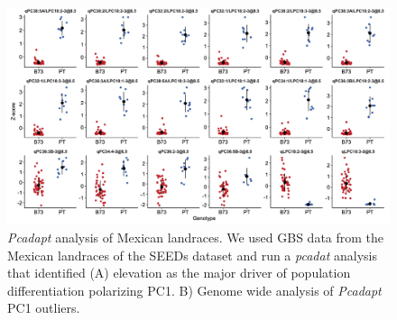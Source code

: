 \documentclass[9pt,twocolumn,twoside,lineno]{BioRxiv}
\begin{document}
\begin{figure}[t]
\begin{center}
\includegraphics[width=0.8\paperwidth]{Sup_Figures/Sup_Fig_2.png}
\caption{\textit{Pcadapt} analysis of Mexican landraces. We used GBS data from the Mexican landraces of the SEEDs dataset \cite{Romero_Navarro2017-cn} and run a \textit{pcadat} analysis \cite{Luu2017-ws} that identified (A) elevation as the major driver of population differentiation polarizing PC1.  
B) Genome wide analysis of \textit{Pcadapt} PC1 outliers. 
}
\label{SupFig2}
\end{center}
\end{figure} 

\clearpage
\end{document}
